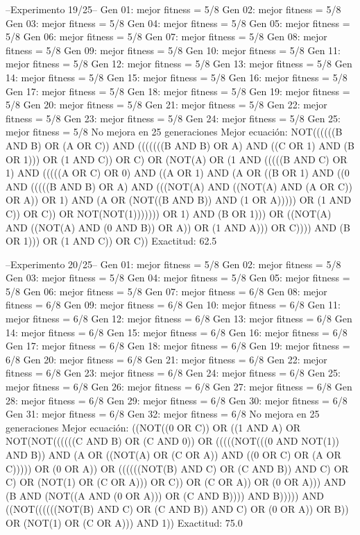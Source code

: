 --Experimento 
 19/25--
Gen 01: mejor fitness = 5/8
Gen 02: mejor fitness = 5/8
Gen 03: mejor fitness = 5/8
Gen 04: mejor fitness = 5/8
Gen 05: mejor fitness = 5/8
Gen 06: mejor fitness = 5/8
Gen 07: mejor fitness = 5/8
Gen 08: mejor fitness = 5/8
Gen 09: mejor fitness = 5/8
Gen 10: mejor fitness = 5/8
Gen 11: mejor fitness = 5/8
Gen 12: mejor fitness = 5/8
Gen 13: mejor fitness = 5/8
Gen 14: mejor fitness = 5/8
Gen 15: mejor fitness = 5/8
Gen 16: mejor fitness = 5/8
Gen 17: mejor fitness = 5/8
Gen 18: mejor fitness = 5/8
Gen 19: mejor fitness = 5/8
Gen 20: mejor fitness = 5/8
Gen 21: mejor fitness = 5/8
Gen 22: mejor fitness = 5/8
Gen 23: mejor fitness = 5/8
Gen 24: mejor fitness = 5/8
Gen 25: mejor fitness = 5/8
No mejora en 25 generaciones
Mejor ecuación: NOT((((((B AND B) OR (A OR C)) AND (((((((B AND B) OR A) AND ((C OR 1) AND (B OR 1))) OR (1 AND C)) OR C) OR (NOT(A) OR (1 AND (((((B AND C) OR 1) AND (((((A OR C) OR 0) AND ((A OR 1) AND (A OR ((B OR 1) AND ((0 AND (((((B AND B) OR A) AND (((NOT(A) AND ((NOT(A) AND (A OR C)) OR A)) OR 1) AND (A OR (NOT((B AND B)) AND (1 OR A))))) OR (1 AND C)) OR C)) OR NOT(NOT(1))))))) OR 1) AND (B OR 1))) OR ((NOT(A) AND ((NOT(A) AND (0 AND B)) OR A)) OR (1 AND A))) OR C)))) AND (B OR 1))) OR (1 AND C)) OR C))
 Exactitud: 62.5%

--Experimento 
 20/25--
Gen 01: mejor fitness = 5/8
Gen 02: mejor fitness = 5/8
Gen 03: mejor fitness = 5/8
Gen 04: mejor fitness = 5/8
Gen 05: mejor fitness = 5/8
Gen 06: mejor fitness = 5/8
Gen 07: mejor fitness = 6/8
Gen 08: mejor fitness = 6/8
Gen 09: mejor fitness = 6/8
Gen 10: mejor fitness = 6/8
Gen 11: mejor fitness = 6/8
Gen 12: mejor fitness = 6/8
Gen 13: mejor fitness = 6/8
Gen 14: mejor fitness = 6/8
Gen 15: mejor fitness = 6/8
Gen 16: mejor fitness = 6/8
Gen 17: mejor fitness = 6/8
Gen 18: mejor fitness = 6/8
Gen 19: mejor fitness = 6/8
Gen 20: mejor fitness = 6/8
Gen 21: mejor fitness = 6/8
Gen 22: mejor fitness = 6/8
Gen 23: mejor fitness = 6/8
Gen 24: mejor fitness = 6/8
Gen 25: mejor fitness = 6/8
Gen 26: mejor fitness = 6/8
Gen 27: mejor fitness = 6/8
Gen 28: mejor fitness = 6/8
Gen 29: mejor fitness = 6/8
Gen 30: mejor fitness = 6/8
Gen 31: mejor fitness = 6/8
Gen 32: mejor fitness = 6/8
No mejora en 25 generaciones
Mejor ecuación: ((NOT((0 OR C)) OR ((1 AND A) OR NOT(NOT((((((C AND B) OR (C AND 0)) OR (((((NOT(((0 AND NOT(1)) AND B)) AND (A OR ((NOT(A) OR (C OR A)) AND ((0 OR C) OR (A OR C))))) OR (0 OR A)) OR ((((((NOT(B) AND C) OR (C AND B)) AND C) OR C) OR (NOT(1) OR (C OR A))) OR C)) OR (C OR A)) OR (0 OR A))) AND (B AND (NOT((A AND (0 OR A))) OR (C AND B)))) AND B))))) AND ((NOT((((((NOT(B) AND C) OR (C AND B)) AND C) OR (0 OR A)) OR B)) OR (NOT(1) OR (C OR A))) AND 1))
 Exactitud: 75.0%

